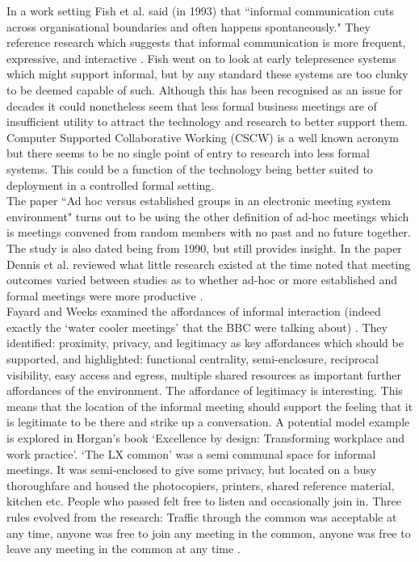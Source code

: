 In a work setting Fish et al. said (in 1993) that ``informal communication cuts across organisational boundaries and often happens spontaneously." They reference research which suggests that informal communication is more frequent, expressive, and interactive \cite{Fish1993}. Fish went on to look at early telepresence systems which might support informal, but by any standard these systems are too clunky to be deemed capable of such. Although this has been recognised as an issue for decades it could nonetheless seem that less formal business meetings are of insufficient utility to attract the technology and research to better support them. Computer Supported Collaborative Working (CSCW) is a well known acronym  but there seems to be no single point of entry to research into less formal systems. This could be a function of the technology being better suited to deployment in a controlled formal setting. \\
The paper ``Ad hoc versus established groups in an electronic meeting system environment" turns out to be using the other definition of ad-hoc meetings which is meetings convened from random members with no past and no future together. The study is also dated being from 1990, but still provides insight. In the paper Dennis et al. reviewed what little research existed at the time noted that meeting outcomes varied between studies as to whether ad-hoc or more established and formal meetings were more productive \cite{Dennis1990}.\\
            Fayard and Weeks examined the affordances of informal interaction (indeed exactly the `water cooler meetings' that the BBC were talking about) \cite{Fayard2007}. They identified: proximity, privacy, and legitimacy as key affordances which should be supported, and highlighted: functional centrality, semi-enclosure, reciprocal visibility, easy access and egress, multiple shared resources as important further affordances of the environment. The affordance of legitimacy is interesting. This means that the location of the informal meeting should support the feeling that it is legitimate to be there and strike up a conversation. 
            A potential model example is explored in Horgan's book `Excellence by design: Transforming workplace and work practice'. `The LX common' was a semi communal space for informal meetings. It was semi-enclosed to give some privacy, but located on a busy thoroughfare and housed the photocopiers, printers, shared reference material, kitchen etc.  People who passed felt free to listen and occasionally join in. Three rules evolved from the research: Traffic through the common was acceptable at any time, anyone was free to join any meeting in the common, anyone was free to leave any meeting in the common at any time \cite{horgen1999excellence}.\\
